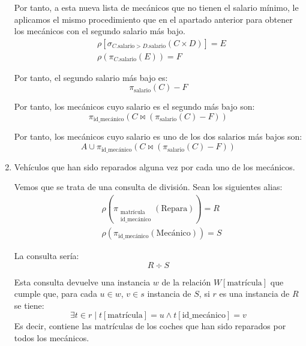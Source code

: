 \begin{ejercicio}
\begin{enumerate}
        Por tanto, a esta nueva lista de mecánicos que no tienen el salario mínimo, le aplicamos el mismo procedimiento que en el apartado anterior para obtener 
        los mecánicos con el segundo salario más bajo.
        \begin{align*}
            & \rho\left[\sigma_{C.\text{salario} > D.\text{salario}}(C \times D)\right] = E\\
            & \rho(\pi_{C.\text{salario}}(E)) = F
        \end{align*}

        Por tanto, el segundo salario más bajo es:
        \begin{equation*}
            \pi_{\text{salario}}(C)-F
        \end{equation*}

        Por tanto, los mecánicos cuyo salario es el segundo más bajo son:
        \begin{equation*}
            \pi_{\text{id\_mecánico}}(C\bowtie (\pi_{\text{salario}}(C)-F))
        \end{equation*}

        Por tanto, los mecánicos cuyo salario es uno de los dos salarios más bajos son:
        \begin{equation*}
            A\cup \pi_{\text{id\_mecánico}}(C\bowtie (\pi_{\text{salario}}(C)-F))
        \end{equation*}

        \item Vehículos que han sido reparados alguna vez por cada uno de los mecánicos.
        
        Vemos que se trata de una consulta de división.
        Sean los siguientes alias:
        \begin{align*}
            & \rho\left(\pi_{\substack{\text{matrícula}\\\text{id\_mecánico}}}(\text{Repara})\right) = R\\
            & \rho(\pi_{\text{id\_mecánico}}(\text{Mecánico})) = S
        \end{align*}

        La consulta sería:
        \begin{equation*}
            R \div S
        \end{equation*}

        Esta consulta devuelve una instancia $w$ de la relación $W[\text{matrícula}]$ que cumple que,
        para cada $u\in w$, $v\in s$ instancia de $S$, si $r$ es una instancia de $R$ se tiene:
        \begin{equation*}
            \exists t\in r\mid t[\text{matrícula}] = u \land t[\text{id\_mecánico}] = v
        \end{equation*}
        Es decir, contiene las matrículas de los coches que han sido reparados por todos los mecánicos.
        


\end{enumerate}
\end{ejercicio}
